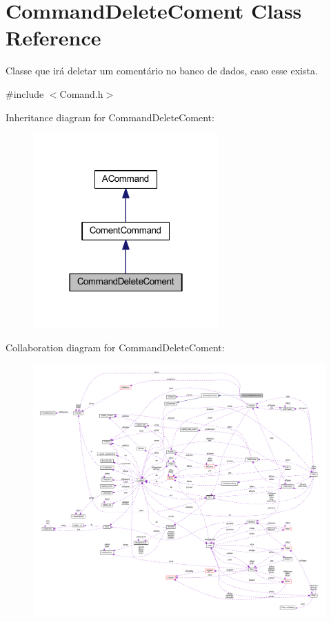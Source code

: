 \hypertarget{class_command_delete_coment}{\section{Command\-Delete\-Coment Class Reference}
\label{class_command_delete_coment}
}


Classe que irá deletar um comentário no banco de dados, caso esse exista.  




{\ttfamily \#include $<$Comand.\-h$>$}



Inheritance diagram for Command\-Delete\-Coment\-:\nopagebreak
\begin{figure}[H]
\begin{center}
\leavevmode
\includegraphics[width=202pt]{class_command_delete_coment__inherit__graph}
\end{center}
\end{figure}


Collaboration diagram for Command\-Delete\-Coment\-:\nopagebreak
\begin{figure}[H]
\begin{center}
\leavevmode
\includegraphics[width=350pt]{class_command_delete_coment__coll__graph}
\end{center}
\end{figure}
